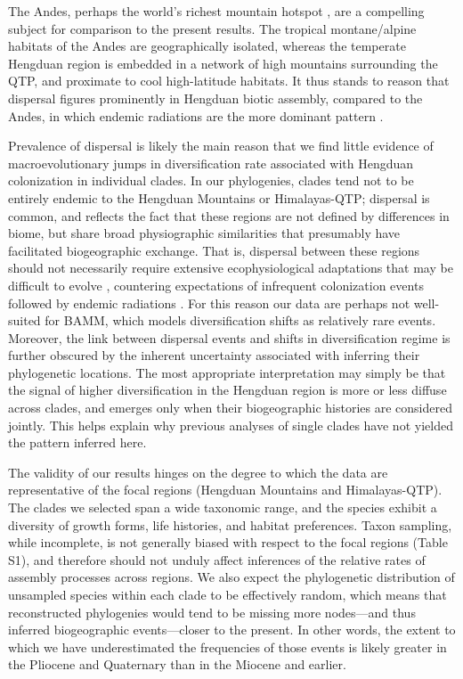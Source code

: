 The Andes, perhaps the world's richest mountain hotspot
\citep{hughes2016}, are a compelling subject for comparison to the
present results. The tropical montane/alpine habitats of the Andes are
geographically isolated, whereas the temperate Hengduan region is
embedded in a network of high mountains surrounding the QTP, and
proximate to cool high-latitude habitats. It thus stands to reason
that dispersal figures prominently in Hengduan biotic assembly,
compared to the Andes, in which endemic radiations are the more
dominant pattern
\citep[e.g.,][]{pennington2010,Lagomarsino2016,Hughes2015,Luebert2014,Hughes2006}.

Prevalence of dispersal is likely the main reason that we find little
evidence of macroevolutionary jumps in diversification rate associated
with Hengduan colonization in individual clades. In our phylogenies,
clades tend not to be entirely endemic to the Hengduan Mountains or
Himalayas-QTP; dispersal is common, and reflects the fact that these
regions are not defined by differences in biome, but share broad
physiographic similarities that presumably have facilitated
biogeographic exchange. That is, dispersal between these regions
should not necessarily require extensive ecophysiological adaptations
that may be difficult to evolve \citep{Donoghue2014}, countering
expectations of infrequent colonization events followed by endemic
radiations \citep[cf.][]{Hughes2006}. For this reason our data are
perhaps not well-suited for BAMM, which models diversification shifts
as relatively rare events. Moreover, the link between dispersal events
and shifts in diversification regime is further obscured by the
inherent uncertainty associated with inferring their phylogenetic
locations. The most appropriate interpretation may simply be that the
signal of higher diversification in the Hengduan region is more or
less diffuse across clades, and emerges only when their biogeographic
histories are considered jointly. This helps explain why previous
analyses of single clades have not yielded the pattern inferred here.

The validity of our results hinges on the degree to which the data are
representative of the focal regions (Hengduan Mountains and
Himalayas-QTP). The clades we selected span a wide taxonomic range,
and the species exhibit a diversity of growth forms, life histories,
and habitat preferences. Taxon sampling, while incomplete, is not
generally biased with respect to the focal regions (Table S1), and
therefore should not unduly affect inferences of the relative rates of
assembly processes across regions. We also expect the phylogenetic
distribution of unsampled species within each clade to be effectively
random, which means that reconstructed phylogenies would tend to be
missing more nodes---and thus inferred biogeographic events---closer
to the present. In other words, the extent to which we have
underestimated the frequencies of those events is likely greater in
the Pliocene and Quaternary than in the Miocene and earlier.


